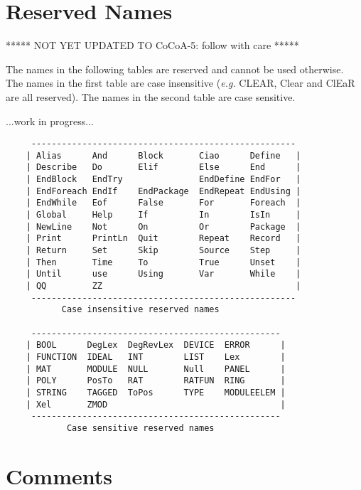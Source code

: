 \documentclass[a4paper]{mybook}
\begin{document}
\section{Reserved Names}
\label{Reserved Names}

        
***** NOT YET UPDATED TO CoCoA-5: follow with care *****
\par 
The names in the following tables are reserved and cannot be used
otherwise.  The names in the first table are case insensitive
(\textit{e.g.} CLEAR, Clear and ClEaR are all reserved).  The names in the
second table are case sensitive.

\par ...work in progress...

\begin{verbatim}
     ----------------------------------------------------
    | Alias      And      Block       Ciao      Define   |
    | Describe   Do       Elif        Else      End      |
    | EndBlock   EndTry               EndDefine EndFor   |
    | EndForeach EndIf    EndPackage  EndRepeat EndUsing |
    | EndWhile   Eof      False       For       Foreach  |
    | Global     Help     If          In        IsIn     |
    | NewLine    Not      On          Or        Package  |
    | Print      PrintLn  Quit        Repeat    Record   |
    | Return     Set      Skip        Source    Step     |
    | Then       Time     To          True      Unset    |
    | Until      use      Using       Var       While    |
    | QQ         ZZ                                      |
     ----------------------------------------------------
           Case insensitive reserved names

     -------------------------------------------------
    | BOOL      DegLex  DegRevLex  DEVICE  ERROR      |
    | FUNCTION  IDEAL   INT        LIST    Lex        |
    | MAT       MODULE  NULL       Null    PANEL      |
    | POLY      PosTo   RAT        RATFUN  RING       |
    | STRING    TAGGED  ToPos      TYPE    MODULEELEM |
    | Xel       ZMOD                                  |
     -------------------------------------------------
            Case sensitive reserved names
\end{verbatim}
	

\section{Comments}
\label{Comments}
\end{document}

